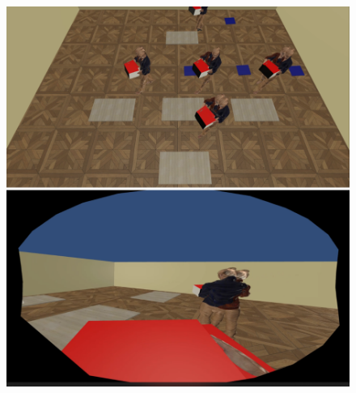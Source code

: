 \begin{figure}[htb]
	\centering
	\includegraphics[width=\textwidth]{figures/perspectiveEGOEXO.png}
	\caption[]{}
	\label{fig:egoexo}
\end{figure}

